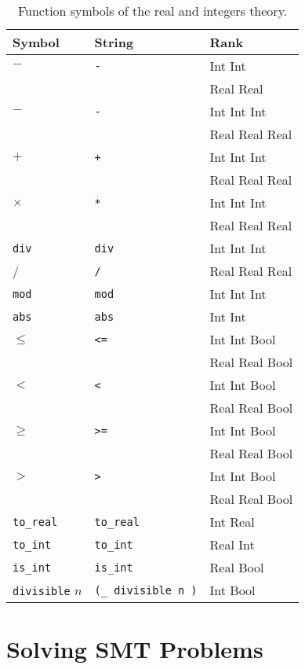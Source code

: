\begin{table}[h]
\centering
\begin{tabular}{lll}
\toprule
\textbf{Symbol} & \textbf{String} & \textbf{Rank} \\
\midrule
$-$ & \texttt{-} & Int Int \\
    &            & Real Real \\
$-$ & \texttt{-} & Int Int Int \\
    &            & Real Real Real \\
$+$ & \texttt{+} & Int Int Int \\
    &            & Real Real Real \\
$\times$ & \texttt{*} & Int Int Int \\
    &               & Real Real Real \\
\texttt{div} & \texttt{div} & Int Int Int \\
/ & \texttt{/} & Real Real Real \\
\texttt{mod} & \texttt{mod} & Int Int Int \\
\texttt{abs} & \texttt{abs} & Int Int \\
$\leq$ & \texttt{<=} & Int Int Bool \\
    &                & Real Real Bool \\
$<$ & \texttt{<} & Int Int Bool \\
    &             & Real Real Bool \\
$\geq$ & \texttt{>=} & Int Int Bool \\
    &               & Real Real Bool \\
$>$ & \texttt{>} & Int Int Bool \\
    &             & Real Real Bool \\
\texttt{to\_real} & \texttt{to\_real} & Int Real \\
\texttt{to\_int}  & \texttt{to\_int} & Real Int \\
\texttt{is\_int}  & \texttt{is\_int} & Real Bool \\
\texttt{divisible} $n$ & \texttt{(\_ divisible n )} & Int Bool \\
\bottomrule
\end{tabular}
\caption{Function symbols of the real and integers theory.}
\label{tab:real-int-funs}
\end{table}


\section{Solving SMT Problems}

